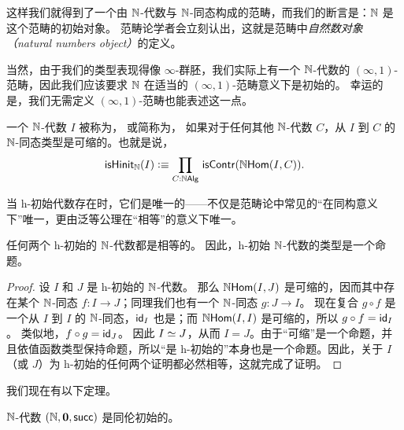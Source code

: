 这样我们就得到了一个由 $\nat$-代数与 $\nat$-同态构成的范畴，而我们的断言是：$\nat$ 是这个范畴的初始对象。
范畴论学者会立刻认出，这就是范畴中\emph{自然数对象（natural numbers object）}的定义。

当然，由于我们的类型表现得像 $\infty$-群胚，我们实际上有一个 $\nat$-代数的 $(\infty,1)$-范畴，因此我们应该要求 $\nat$ 在适当的 $(\infty,1)$-范畴意义下是初始的。
幸运的是，我们无需定义 $(\infty,1)$-范畴也能表述这一点。

\begin{defn}
  一个 $\nat$-代数 $I$ 被称为，
  或简称为，
  如果对于任何其他 $\nat$-代数 $C$，从 $I$ 到 $C$ 的 $\nat$-同态类型是可缩的。也就是说，
\begin{equation*}
\ishinitn(I) \defeq \prd{C : \nalg} \iscontr(\nhom(I,C)).
\end{equation*}
\end{defn}

当 h-初始代数存在时，它们是唯一的——不仅是范畴论中常见的``在同构意义下''唯一，更由泛等公理在``相等''的意义下唯一。

\begin{thm}
  任何两个 h-初始的 $\nat$-代数都是相等的。
  因此，h-初始 $\nat$-代数的类型是一个命题。
\end{thm}

\begin{proof}
  设 $I$ 和 $J$ 是 h-初始的 $\nat$-代数。
  那么 $\nhom(I,J)$ 是可缩的，因而其中存在某个 $\nat$-同态 $f:I\to J$；同理我们也有一个 $\nat$-同态 $g:J\to I$。
  现在复合 $g\circ f$ 是一个从 $I$ 到 $I$ 的 $\nat$-同态，$\idfunc[I]$ 也是；而 $\nhom(I,I)$ 是可缩的，所以 $g\circ f = \idfunc[I]$。
  类似地，$f\circ g = \idfunc[J]$。
  因此 $\eqv IJ$，从而 $I=J$。由于``可缩''是一个命题，并且依值函数类型保持命题，所以``是 h-初始的''本身也是一个命题。因此，关于 $I$（或 $J$）为 h-初始的任何两个证明都必然相等，这就完成了证明。
\end{proof}

我们现在有以下定理。

\begin{thm}\label{thm:nat-hinitial}
$\nat$-代数 $(\nat, \emptyt, \suc)$ 是同伦初始的。
\end{thm}

